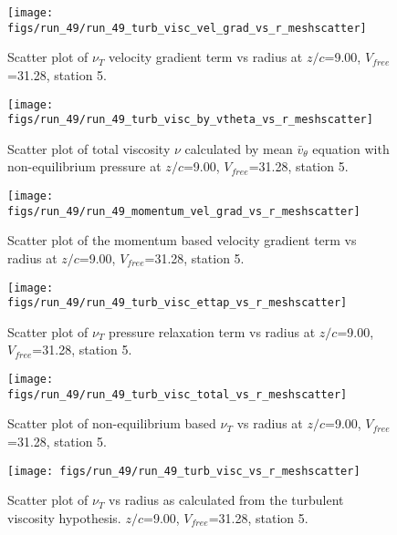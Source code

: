 \begin{figure}[H]
\centering
\texttt{[image: figs/run\_49/run\_49\_turb\_visc\_vel\_grad\_vs\_r\_meshscatter]}
\caption{Scatter plot of $\nu_T$ velocity gradient term vs radius at $z/c$=9.00, $V_{free}$=31.28, station 5.}
\end{figure}


\begin{figure}[H]
\centering
\texttt{[image: figs/run\_49/run\_49\_turb\_visc\_by\_vtheta\_vs\_r\_meshscatter]}
\caption{Scatter plot of total viscosity $\nu$ calculated by mean $\bar{v}_{\theta}$ equation with non-equilibrium pressure at $z/c$=9.00, $V_{free}$=31.28, station 5.}
\end{figure}


\begin{figure}[H]
\centering
\texttt{[image: figs/run\_49/run\_49\_momentum\_vel\_grad\_vs\_r\_meshscatter]}
\caption{Scatter plot of the momentum based velocity gradient term vs radius at $z/c$=9.00, $V_{free}$=31.28, station 5.}
\end{figure}


\begin{figure}[H]
\centering
\texttt{[image: figs/run\_49/run\_49\_turb\_visc\_ettap\_vs\_r\_meshscatter]}
\caption{Scatter plot of $\nu_T$ pressure relaxation term vs radius at $z/c$=9.00, $V_{free}$=31.28, station 5.}
\end{figure}


\begin{figure}[H]
\centering
\texttt{[image: figs/run\_49/run\_49\_turb\_visc\_total\_vs\_r\_meshscatter]}
\caption{Scatter plot of non-equilibrium based $\nu_T$ vs radius at $z/c$=9.00, $V_{free}$=31.28, station 5.}
\end{figure}


\begin{figure}[H]
\centering
\texttt{[image: figs/run\_49/run\_49\_turb\_visc\_vs\_r\_meshscatter]}
\caption{Scatter plot of $\nu_T$ vs radius as calculated from the turbulent viscosity hypothesis. $z/c$=9.00, $V_{free}$=31.28, station 5.}
\end{figure}


